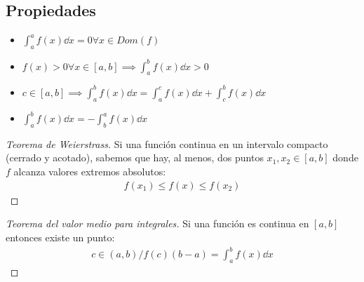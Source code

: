 \documentclass{article}
\begin{document}
\subsection{Propiedades}
\begin{itemize}
    \item $ \int_{a}^a f(x) \dd{x}=0 \forall x \in Dom(f)$
    \item $f(x)>0 \forall x \in [a,b] \implies \int _{a}^b f(x)\dd{x}>0$
    \item $c \in [a,b] \implies \int_{a}^b f(x) \dd{x} = \int _{a}^c f(x) \dd{x} + \int _{c}^b f(x)\dd{x}$
    \item $ \int _{a}^b f(x) \dd{x} = - \int _{b}^a f(x) \dd{x}$ 
\end{itemize}
\begin{proof}[Teorema de Weierstrass]
    Si una función continua en un intervalo compacto (cerrado y acotado), sabemos que hay, al menos, dos puntos
    $x_{1},x_{2} \in [a,b]$ donde $f$ alcanza valores extremos absolutos:
    \begin{equation}
        \begin{split}
            f(x_{1}) \leq f(x) \leq f(x_{2})
        \end{split}
    \end{equation}
\end{proof}
\begin{proof}[Teorema del valor medio para integrales]
    Si una función es continua en $[a,b]$ entonces existe un punto:
    \begin{equation}
        \begin{split}
            c \in (a,b) / f(c)(b-a) = \int_{a}^b f(x) \dd{x}
        \end{split}
    \end{equation}
\end{proof}
\end{document}
